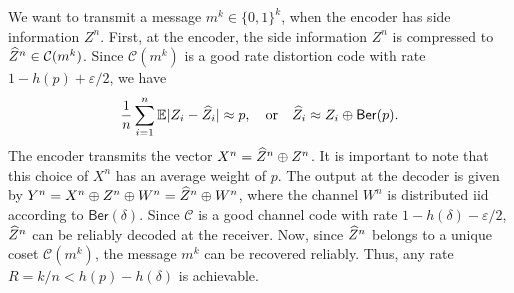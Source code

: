 We want to transmit a message $m^k \in \{0,1\}^k$, when the encoder has side information $Z^n$.
First, at the encoder, the side information $Z^n$ is compressed to $\widehat{Z}^n \in \mathcal{C}(m^k)$.
Since $\mathcal{C}(m^k)$ is a good rate distortion code with rate $1 - h(p) + \varepsilon/2$, we have
\begin{align*}
  \frac{1}{n} \sum_{i=1}^n \mathbb{E} |Z_i -\widehat{Z}_i| \approx p, \quad \text{or} \quad \widehat{Z}_i \approx Z_i \oplus \mathsf{Ber}(p) . 
\end{align*}
The encoder transmits the vector $X^n = \widehat{Z}^n \oplus Z^n$.
It is important to note that this choice of $X^n$ has an average weight of $p$.
The output at the decoder is given by $Y^n = X^n \oplus Z^n \oplus W^n = \widehat{Z}^n \oplus W^n$, where the channel $W^n$ is distributed iid according to $\mathsf{Ber}(\delta)$.
Since $\mathcal{C}$ is a good channel code with rate $1-h(\delta) -\varepsilon/2$, $\widehat{Z}^n$ can be reliably decoded at the receiver.
Now, since $\widehat{Z}^n$ belongs to a unique coset $\mathcal{C}(m^k)$, the message $m^k$ can be recovered reliably.
Thus, any rate $R=k/n<h(p)-h(\delta)$ is achievable.

